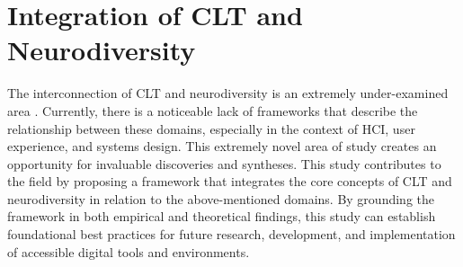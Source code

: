\section{Integration of CLT and Neurodiversity}
The interconnection of CLT and neurodiversity is an extremely under-examined area \cite{lecunff2024}. Currently, there is a noticeable lack of frameworks that describe the relationship between these domains, especially in the context of HCI, user experience, and systems design. This extremely novel area of study creates an opportunity for invaluable discoveries and syntheses. This study contributes to the field by proposing a framework that integrates the core concepts of CLT and neurodiversity in relation to the above-mentioned domains. By grounding the framework in both empirical and theoretical findings, this study can establish foundational best practices for future research, development, and implementation of accessible digital tools and environments.

